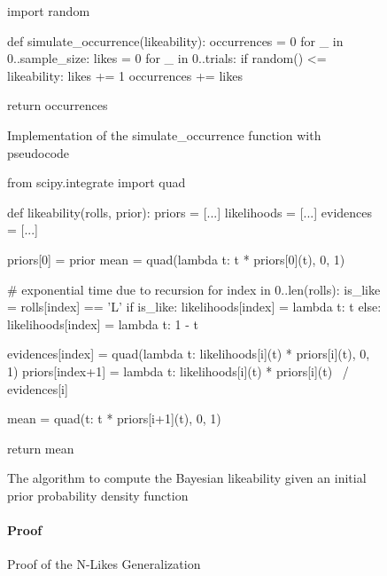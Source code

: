 \documentclass[a4paper,11pt]{article}
\begin{document}
\begin{figure}[H]
    \begin{pythonln}
import random

def simulate_occurrence(likeability):
    occurrences = 0
    for _ in 0..sample_size:
        likes = 0
        for _ in 0..trials:
            if random() <= likeability:
                likes += 1
            occurrences += likes

    return occurrences
    \end{pythonln}
    \caption{Implementation of the simulate\_occurrence function with pseudocode}
    \label{apd:sim_occ}
\end{figure}

\begin{figure}[H]
    \begin{pythonln}
from scipy.integrate import quad

def likeability(rolls, prior):
    priors = [...]
    likelihoods = [...]
    evidences = [...]

    priors[0] = prior
    mean = quad(lambda t: t * priors[0](t), 0, 1)

    # exponential time due to recursion
    for index in 0..len(rolls):
        is_like = rolls[index] == 'L'
        if is_like:
            likelihoods[index] = lambda t: t
        else:
            likelihoods[index] = lambda t: 1 - t

        evidences[index] = quad(lambda t: likelihoods[i](t) * priors[i](t),
                               0, 1)
        priors[index+1] = lambda t: likelihoods[i](t) * priors[i](t) \
                                / evidences[i]

        mean = quad(t: t * priors[i+1](t), 0, 1)

    return mean
    \end{pythonln}
    \caption{The algorithm to compute the Bayesian likeability given an initial prior probability density function}
    \label{apd:algo}
\end{figure}

\begin{figure}[H]
    \paragraph{Proof} 

    \caption{Proof of the N-Likes Generalization}
    \label{eq:nlikeproof}
\end{figure}
\end{document}
